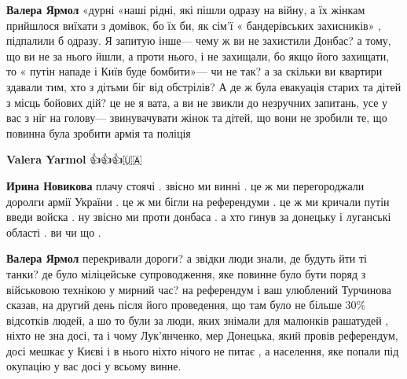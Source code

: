\begin{itemize}
\begin{itemize}
 
\textbf{Валера Ярмол} «дурні «наші рідні, які пішли одразу на війну, а їх жінкам прийшлося виїхати з домівок, бо їх би, як сім’ї « бандерівських захисників» , підпалили б одразу. Я запитую інше— чему ж ви не захистили Донбас? а тому, що ви не за нього йшли, а проти нього, і не захищали, бо якщо його захищати, то « путін нападе і Київ буде бомбити»— чи не так? а за скільки ви квартири здавали тим, хто з дітьми біг від обстрілів? А де ж була евакуація старих та дітей з місць бойових дій? це не я вата, а ви не звикли до незручних запитань, усе у вас з ніг на голову— звинувачувати жінок та дітей, що вони не зробили те, що повинна була зробити армія та поліція

 
\textbf{Valera Yarmol} 👍👍👍🇺🇦

 
\textbf{Ирина Новикова} плачу стоячі . звісно ми винні . це ж ми перегороджали доролги армії України . це ж ми бігли на референдуми . це ж ми кричали путін введи войска . ну звісно ми проти донбаса . а хто гинув за донецьку і луганські області . ви чи що .

 
\textbf{Валера Ярмол} перекривали дороги? а звідки люди знали, де будуть йти ті
танки? де було міліцейське супроводження, яке повинне було бути поряд з
військовою технікою у мирний час? на референдум і ваш улюблений Турчинова
сказав, на другий день після його проведення, що там було не більше 30\%
відсотків людей, а шо то були за люди, яких знімали для малюнків рашатудей ,
ніхто не зна досі, та і чому Лук’янченко, мер Донецька, який провів референдум,
досі мешкає у Києві і в нього ніхто нічого не питає , а населення, яке попали
під окупацію у вас досі у всьому винне.


\end{itemize}
\end{itemize}
